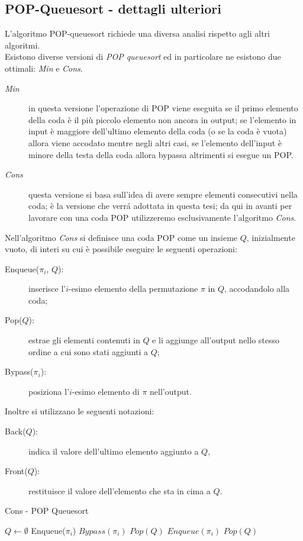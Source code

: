 \subsection{POP-Queuesort - dettagli ulteriori}L'algoritmo POP-queuesort richiede una diversa analisi rispetto agli altri algoritmi.\\
Esistono diverse versioni di \textit{POP queuesort} ed in particolare ne esistono due ottimali\cite{cioni2021sorting}: \textit{Min} e \textit{Cons}.
\begin{description}
	\item[\textit{Min}] in questa versione l'operazione di POP viene eseguita se il primo elemento della coda \`e il pi\`u piccolo elemento non ancora in output; se l'elemento in input \`e maggiore dell'ultimo elemento della coda (o se la coda \`e vuota) allora viene accodato mentre negli altri casi, se l'elemento dell'input \`e minore della testa della coda allora bypassa altrimenti si esegue un POP.
	\item[\textit{Cons}] questa versione si basa sull'idea di avere sempre elementi consecutivi nella coda; \`e la versione che verr\'a adottata in questa tesi; da qui in avanti per lavorare con una coda POP utilizzeremo esclusivamente l'algoritmo \textit{Cons}\cite{cioni2021sorting}.
\end{description}
Nell'algoritmo \textit{Cons} si definisce una coda POP come un insieme $Q$, inizialmente vuoto, di interi su cui \`e possibile eseguire le seguenti operazioni:
\begin{description}
	\item[Enqueue($\pi_i$, $Q$):] inserisce l'$i$-esimo elemento della permutazione $\pi$ in $Q$, accodandolo alla coda;
	\item[Pop($Q$):] estrae gli elementi contenuti in $Q$ e li aggiunge all'output nello stesso ordine a cui sono stati aggiunti a $Q$;
	\item[Bypass($\pi_i$):] posiziona l'$i$-esimo elemento di $\pi$ nell'output.
\end{description}
Inoltre si utilizzano le seguenti notazioni:
\begin{description}
	\item[Back($Q$):] indica il valore dell'ultimo elemento aggiunto a $Q$,
	\item[Front($Q$):] restituisce il valore dell'elemento che sta in cima a $Q$.
\end{description}
\begin{algorithm}[H]
   \caption{Cons - POP Queuesort}
\begin{algorithmic}[1]
\State $Q\leftarrow\emptyset$ 
		\State Enqueue($\pi_i$)
	\Else
			\State $Bypass(\pi_i)$
		\Else
			\State $Pop(Q)$
			\State $Enqueue(\pi_i)$
		\EndIf
	\EndIf
\EndFor
{}
\State $Pop(Q)$
\EndIf
\end{algorithmic}
\end{algorithm}
